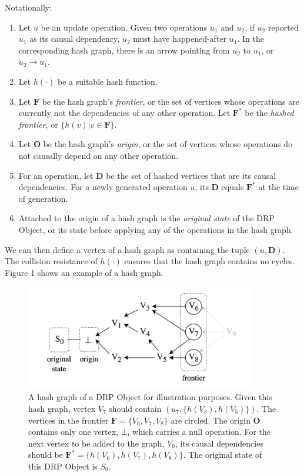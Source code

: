 \documentclass{article}
\begin{document}
Notationally:
\begin{enumerate}
    \item Let $u$ be an update operation. Given two operations $u_1$ and $u_2$, if $u_2$ reported $u_1$ as its causal dependency, $u_2$ must have happened-after $u_1$. In the corresponding hash graph, there is an arrow pointing from $u_2$ to $u_1$, or $u_2 \rightarrow u_1$.
    \item Let $h(\cdot)$ be a suitable hash function.
    \item Let $\textbf{F}$ be the hash graph's \textit{frontier}, or the set of vertices whose operations are currently not the dependencies of any other operation. Let $\textbf{F}^*$ be the \textit{hashed frontier}, or $\{h(v) | v \in \textbf{F}\}$.
    \item Let $\textbf{O}$ be the hash graph's \textit{origin}, or the set of vertices whose operations do not causally depend on any other operation.
    \item For an operation, let $\textbf{D}$ be the set of hashed vertices that are its causal dependencies. For a newly generated operation $u$, its $\textbf{D}$ equals $\textbf{F}^*$ at the time of generation.
    \item Attached to the origin of a hash graph is the \textit{original state} of the DRP Object, or its state before applying any of the operations in the hash graph.
\end{enumerate}
We can then define a vertex of a hash graph as containing the tuple $(u, \textbf{D})$. The collision resistance of $h(\cdot)$ ensures that the hash graph contains no cycles. Figure 1 shows an example of a hash graph.

\begin{figure}[htp]
    \centering
    \includegraphics[width=10cm]{fig1}
    \caption{A hash graph of a DRP Object for illustration purposes. Given this hash graph, vertex $V_7$ should contain $(u_7, \{h(V_3),h(V_5)\})$. The vertices in the frontier $\textbf{F} = \{V_6, V_7, V_8\}$ are circled. The origin $\textbf{O}$ contains only one vertex, $\bot$, which carries a null operation. For the next vertex to be added to the graph, $V_9$, its causal dependencies should be $\textbf{F}^* = \{h(V_6), h(V_7), h(V_8)\}$. The original state of this DRP Object is $S_0$.}
    \label{fig:1}
\end{figure}
\end{document}
